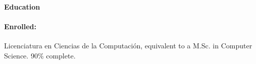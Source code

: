 \paragraph{Education}

\paragraph{Enrolled:}
Licenciatura en Ciencias de la Computaci\'{o}n, equivalent to a M.Sc. in
Computer Science.  90\% complete.


